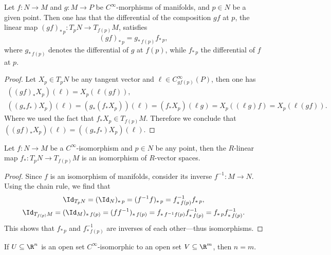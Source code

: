 \begin{proposition}
\label{prop:chain-rule}
Let \(f: N \to M\) and \(g: M \to P\) be \(C^{\infty}\)-morphisms of manifolds,
and \(p \in N\) be a given point. Then one has that the differential of the
composition \(g f\) at \(p\), the linear map
\((g f)_{*\, p}: T_pN \to T_{f(p)}M\), satisfies
\[
(g f)_{*\, p} = g_{*\, f(p)} f_{*\, p} ,
\]
where \(g_{*\, f(p)}\) denotes the differential of \(g\) at \(f(p)\), while
\(f_{*\, p}\) the differential of \(f\) at \(p\).
\end{proposition}

\begin{proof}
Let \(X_p \in T_p N\) be any tangent vector and
\(\ell \in C_{g f(p)}^{\infty}(P)\), then one has
\begin{gather*}
((g f)_{*} X_p)(\ell) = X_p(\ell (g f)),
\\
((g_{*} f_{*})X_p)(\ell)
= (g_{*}(f_{*} X_p))(\ell)
= (f_* X_p)(\ell g)
= X_p ((\ell g) f)
= X_p (\ell (g f)).
\end{gather*}
Where we used the fact that \(f_{*} X_p \in T_{f(p)} M\). Therefore we conclude
that \(((g f)_{*} X_p)(\ell) = ((g_{*} f_{*}) X_p)(\ell)\).
\end{proof}

\begin{corollary}
\label{cor:iso-of-mfld-to-iso-of-vect-spaces}
Let \(f: N \to M\) be a \(C^{\infty}\)-isomorphism and \(p \in N\) be any
point, then the \(R\)-linear map \(f_{*}: T_p N \to T_{f(p)} M\) is an
isomorphism of \(R\)-vector spaces.
\end{corollary}

\begin{proof}
Since \(f\) is an isomorphism of manifolds, consider its inverse \(f^{-1}: M \to
N\). Using the chain rule, we find that
\begin{gather*}
\Id_{T_p N} = (\Id_N)_{*\, p} = (f^{-1} f)_{*\, p} = f^{-1}_{*\, f(p)} f_{*\, p},
\\
\Id_{T_{f(p)} M}
= (\Id_M)_{*\, f(p)}
= (f f^{-1})_{*\, f(p)}
= f_{*\, f^{-1} f(p)} f^{-1}_{*\, f(p)}
= f_{*\, p} f^{-1}_{*\, f(p)}.
\end{gather*}
This shows that \(f_{*\, p}\) and \(f^{-1}_{*\, f(p)}\) are inverses of each
other---thus isomorphisms.
\end{proof}

\begin{corollary}
\label{cor:dimension-invariance}
If \(U \subseteq \R^n\) is an open set \(C^{\infty}\)-isomorphic to an open set
\(V \subseteq \R^m\), then \(n = m\).
\end{corollary}


